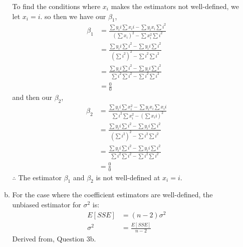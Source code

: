 \documentclass[12pt]{article}
\begin{document}
\begin{enumerate}[1.]
\begin{enumerate}[(a)]
            To find the conditions where $x_i$ makes the estimators not well-defined, we let $x_i = i$.
            so then we have our $\beta_1$,
            \begin{align*}
                \beta_1 &= \frac{\sum y_i i\sum  x_i i - \sum y_i  x_i \sum i^2}{(\sum  x_i)^2 - \sum  x_i^2 \sum i^2 } \\
                &= \frac{\sum y_i i\sum  i^2 - \sum y_i  i \sum i^2}{(\sum i^2)^2 - \sum i^2 \sum i^2 }\\
                &= \frac{\sum y_i i\sum  i^2 - \sum y_i  i \sum i^2}{\sum i^2\sum i^2 - \sum i^2 \sum i^2 }\\
                &= \frac{0}{0}
            \end{align*}
            and then our $\beta_2$, 
            \begin{align*}
                \beta_2 &= \frac{\sum  y_i i \sum  x_i^2 - \sum  y_i x_i \sum  x_i i}{\sum  i^2 \sum  x_i^2 - (\sum  x_i i)^2} \\
                &= \frac{\sum  y_i i \sum   i^2 - \sum  y_i  i \sum   i^2}{(\sum i^2)^2 - \sum i^2 \sum i^2 }\\
                &= \frac{\sum  y_i i \sum   i^2 - \sum  y_i  i \sum   i^2}{\sum i^2 \sum i^2 - \sum i^2 \sum i^2 }\\
                &= \frac{0}{0}
            \end{align*}
            $\therefore$ The estimator $\beta_1$ and $\beta_2$ is not well-defined at $x_i = i$.

            \item For the case where the coefficient estimators are well-defined, the unbiased estimator for $\sigma^2$ is:
            \begin{align*}
                E[SSE] &= (n-2)\sigma^2 \\ 
                \sigma^2 &= \frac{E[SSE]}{n-2}
            \end{align*}
            Derived from, Question 3b.
        \end{enumerate}
    

\end{enumerate}
\end{document}
